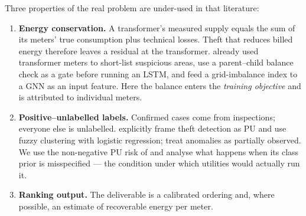 \documentclass[11pt,a4paper]{article}
\theoremstyle{plain}
\theoremstyle{definition}
\theoremstyle{remark}
\begin{document}
Three properties of the real problem are under-used in that literature:
\begin{enumerate}
\item \textbf{Energy conservation.} A transformer's measured supply equals the sum of its meters' true consumption plus technical losses. Theft that reduces billed energy therefore leaves a residual at the transformer. \citet{jokar2016} already used transformer meters to short-list suspicious areas, \citet{collier2025} use a parent--child balance check as a gate before running an LSTM, and \citet{oguntola2026} feed a grid-imbalance index to a GNN as an input feature. Here the balance enters the \emph{training objective} and is attributed to individual meters.
\item \textbf{Positive--unlabelled labels.} Confirmed cases come from inspections; everyone else is unlabelled. \citet{hu2024fcm} explicitly frame theft detection as PU and use fuzzy clustering with logistic regression; \citet{chen2024partial} treat anomalies as partially observed. We use the non-negative PU risk of \citet{kiryo2017} and analyse what happens when its class prior is misspecified --- the condition under which utilities would actually run it.
\item \textbf{Ranking output.} The deliverable is a calibrated ordering and, where possible, an estimate of recoverable energy per meter.
\end{enumerate}
\end{document}

